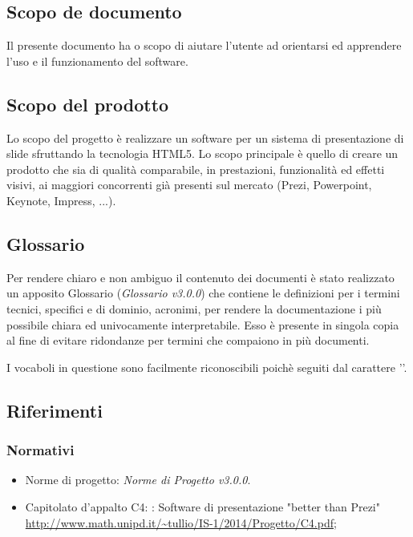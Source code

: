 \subsection{Scopo de documento}
Il presente documento ha o scopo di aiutare l'utente ad orientarsi ed apprendere l'uso e il funzionamento del software.

\subsection{Scopo del prodotto}
Lo scopo del progetto è realizzare un software per un sistema di presentazione di \gls{slide} sfruttando la tecnologia \gls{HTML5}. Lo scopo principale è quello di creare un prodotto che sia di qualità comparabile, in prestazioni, funzionalità ed effetti visivi, ai maggiori concorrenti già presenti sul mercato (Prezi, Powerpoint, Keynote, Impress, ...).

\subsection{Glossario}
Per rendere chiaro e non ambiguo il contenuto dei documenti è stato realizzato un apposito Glossario (\textit{Glossario v3.0.0}) che contiene le definizioni per i termini tecnici, specifici e di dominio, acronimi, per rendere la documentazione i più possibile chiara ed univocamente interpretabile. Esso è presente in singola copia al fine di evitare ridondanze per termini che compaiono in più documenti.

I vocaboli in questione sono facilmente riconoscibili poichè seguiti dal carattere ''.

\subsection{Riferimenti}
\subsubsection{Normativi}

\begin{itemize}
	\item Norme di progetto: \textit{Norme di Progetto v3.0.0}.
	\item Capitolato d'appalto C4: \PROGETTO: Software di presentazione "better than Prezi" \\ \url{http://www.math.unipd.it/~tullio/IS-1/2014/Progetto/C4.pdf};
\end{itemize}
